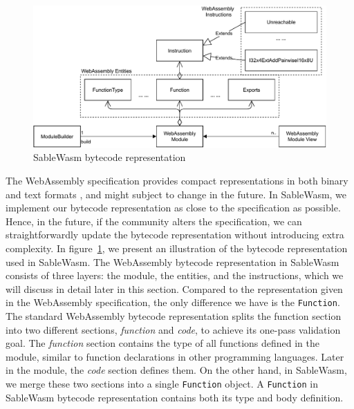 \begin{figure}
  \centering
  \includegraphics[width=\textwidth]{Images/sablewasm-bytecode.pdf}
  \caption{SableWasm bytecode representation}
  \label{fig:sablewasm-bytecode}
\end{figure}

The WebAssembly specification provides compact representations in both binary
and text formats \cite{10.1145/3062341.3062363}, and might subject to change in
the future. In SableWasm, we implement our bytecode representation as close to
the specification as possible. Hence, in the future, if the community alters
the specification, we can straightforwardly update the bytecode representation
without introducing extra complexity. In figure~\ref{fig:sablewasm-bytecode},
we present an illustration of the bytecode representation used in SableWasm.
The WebAssembly bytecode representation in SableWasm consists of three layers:
the module, the entities, and the instructions, which we will discuss in detail
later in this section. Compared to the representation given in the WebAssembly
specification, the only difference we have is the \texttt{Function}. The
standard WebAssembly bytecode representation splits the function section into
two different sections, \emph{function} and \emph{code}, to achieve its
one-pass validation goal. The \emph{function} section contains the type of all
functions defined in the module, similar to function declarations in other
programming languages. Later in the module, the \emph{code} section defines
them. On the other hand, in SableWasm, we merge these two sections into a single
\texttt{Function} object. A \texttt{Function} in SableWasm bytecode
representation contains both its type and body definition.

